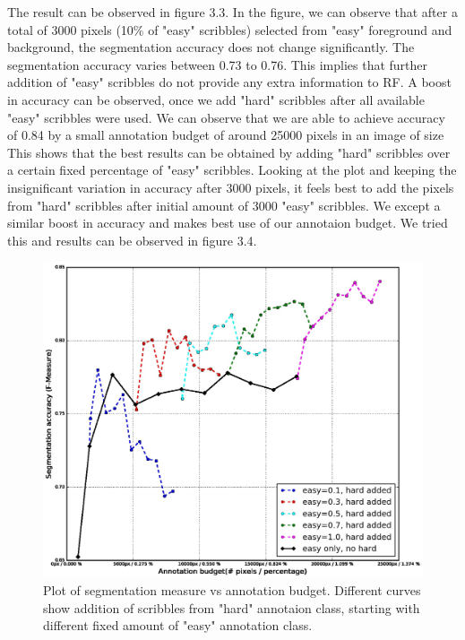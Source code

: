 The result can be observed in figure 3.3. In the figure, we can observe that after a total of 3000 pixels (10\% of "easy" scribbles) selected from "easy" foreground and background, the segmentation accuracy does not change significantly. The segmentation accuracy varies between 0.73 to 0.76. This implies that further addition of "easy" scribbles do not provide any extra information to RF. A boost in accuracy can be observed, once we add "hard" scribbles after all available "easy" scribbles were used. We can observe that we are able to achieve accuracy of 0.84 by a small annotation budget of around 25000 pixels in an image of size This shows that the best results can be obtained by adding "hard" scribbles over a certain fixed percentage of "easy" scribbles. Looking at the plot and keeping the insignificant variation in accuracy after 3000 pixels, it feels best to add the pixels from "hard" scribbles after initial amount of 3000 "easy" scribbles. We except a similar boost in accuracy and makes best use of our annotaion budget. We tried this and results can be observed in figure 3.4.

\begin{figure}[h!] \label{fig:easy_hard1}
\centering
 \includegraphics[width=0.85\linewidth]{figures/pres/rf_easy_hard.jpg}
\caption{Plot of segmentation measure vs annotation budget. Different curves show addition of scribbles from "hard" annotaion class, starting with different fixed amount of "easy" annotation class.}
\end{figure}

